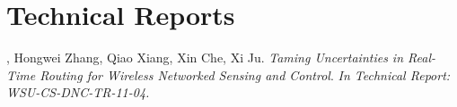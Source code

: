 \section{Technical Reports}
\begin{thebibliography}{6}
, Hongwei Zhang, Qiao Xiang, Xin Che, Xi Ju.
\newblock \emph{Taming Uncertainties in Real-Time Routing for Wireless Networked Sensing and Control}.
\newblock \emph{In Technical Report: WSU-CS-DNC-TR-11-04.}

\end{thebibliography}